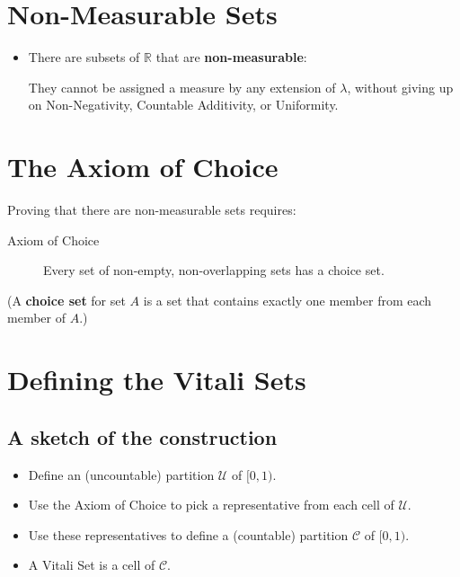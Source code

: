 \documentclass[12pt]{extarticle}
\begin{document}
\section{Non-Measurable Sets}
\label{sec:non-measurable-sets}


\begin{itemize}
\item There are subsets of $\mathbb{R}$ that are \textbf{non-measurable}:

They cannot be assigned a measure by any {extension} of $\lambda$, without giving up on Non-Negativity, Countable Additivity, or Uniformity.

\end{itemize}




\section{The Axiom of Choice}\label{the-axiom-of-choice}

Proving that there are non-measurable sets requires:

\begin{description}
\item[Axiom of Choice]
Every set of non-empty, non-overlapping sets has a choice set.
\end{description}
(A \textbf{choice set} for set $A$ is a set that contains exactly one member from each member of $A$.)



\section{Defining the Vitali Sets}

\subsection{A sketch of the construction}

\begin{itemize}

\item Define an (uncountable) partition $\mathcal{U}$ of $[0,1)$.

\item Use the Axiom of Choice to pick a representative from each cell of $\mathcal{U}$.

\item Use these representatives to define a (countable) partition $\mathcal{C}$ of $[0,1)$.

\item A Vitali Set is a cell of $\mathcal{C}$.

\end{itemize}
\end{document}
